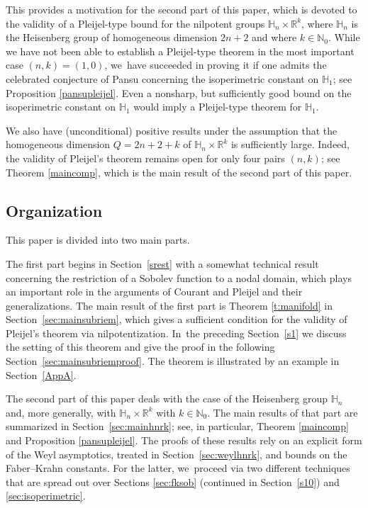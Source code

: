 \documentclass[10pt]{amsart}
\theoremstyle{definition}
\newcommand{\1}{\mathbbm{1}}
\newcommand{\N}{\mathbb{N}}
\newcommand{\R}{\mathbb{R}}
\begin{document}
This provides a motivation for the second part of this paper, which is devoted to the validity of a Pleijel-type bound for the nilpotent groups $\mathbb H_n \times \mathbb R^k$, where $\mathbb H_n $ is the Heisenberg group of homogeneous dimension $2n+2$ and where $k\in\N_0$. While we have not been able to establish a Pleijel-type theorem in the most important case $(n,k)=(1,0)$, we~have succeeded in proving it if one admits the celebrated conjecture of Pansu concerning the isoperimetric constant on $\mathbb H_1$; see Proposition \ref{pansupleijel}. Even a nonsharp, but sufficiently good bound on the isoperimetric constant on $\mathbb H_1$ would imply a Pleijel-type theorem for $\mathbb H_1$.

We also have (unconditional) positive results under the assumption that the homogeneous dimension $Q=2n+2+k$ of $\mathbb H_n\times\R^k$ is sufficiently large. Indeed, the validity of Pleijel's theorem remains open for only four pairs $(n,k)$; see Theorem \ref{maincomp}, which is the main result of the second part of this paper.

\subsection{Organization}
This paper is divided into two main parts.

The first part begins in Section~\ref{srest} with a somewhat technical result concerning the restriction of a Sobolev function to a nodal domain, which plays an important role in the arguments of Courant and Pleijel and their generalizations. The main result of the first part is Theorem \ref{t:manifold} in Section~\ref{sec:mainsubriem}, which gives a sufficient condition for the validity of Pleijel's theorem via nilpotentization. In~the preceding Section~\ref{s1} we discuss the setting of this theorem and give the proof in the following Section~\ref{sec:mainsubriemproof}. The theorem is illustrated by an example in Section~\ref{AppA}.

The second part of this paper deals with the case of the Heisenberg group $\mathbb H_n$ and, more generally, with $\mathbb H_n\times\R^k$ with $k\in\N_0$. The main results of that part are summarized in Section~\ref{sec:mainhnrk}; see, in particular, Theorem \ref{maincomp} and Proposition \ref{pansupleijel}. The proofs of these results rely on an explicit form of the Weyl asymptotics, treated in Section~\ref{sec:weylhnrk}, and bounds on the Faber--Krahn constants. For the latter, we~proceed via two different techniques that are spread out over Sections \ref{sec:fksob} (continued in Section~\ref{s10}) and \ref{sec:isoperimetric}.
\end{document}
